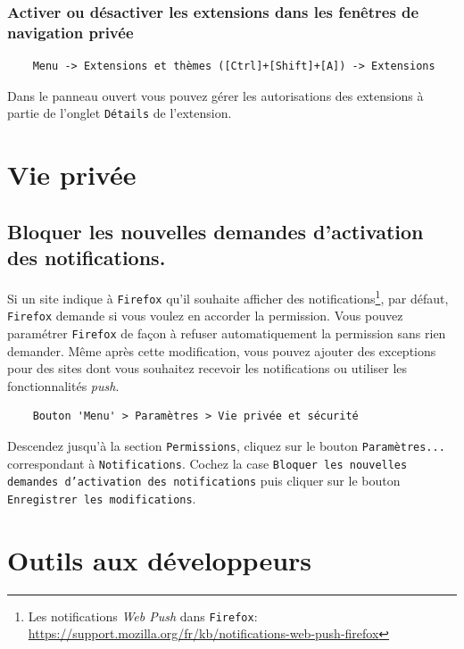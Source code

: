 \documentclass[a4paper,11pt]{book}
\begin{document}
\subsection*{Activer ou désactiver les extensions dans les fenêtres de navigation privée}
\begin{verbatim}
    Menu -> Extensions et thèmes ([Ctrl]+[Shift]+[A]) -> Extensions
\end{verbatim}
\medskip

Dans le panneau ouvert vous pouvez gérer les autorisations des extensions à partie de l'onglet \texttt{Détails} de l'extension.
\medskip

\chapter{Vie privée}
\section{Bloquer les nouvelles demandes d’activation des notifications.}
Si un site indique à \texttt{Firefox} qu’il souhaite afficher des notifications\footnote{Les notifications \textit{Web Push} dans \texttt{Firefox}: \url{https://support.mozilla.org/fr/kb/notifications-web-push-firefox}}, par défaut, \texttt{Firefox} demande si vous voulez en accorder la permission. Vous pouvez paramétrer \texttt{Firefox} de façon à refuser automatiquement la permission sans rien demander. Même après cette modification, vous pouvez ajouter des exceptions pour des sites dont vous souhaitez recevoir les notifications ou utiliser les fonctionnalités \textit{push}.
\begin{verbatim}
    Bouton 'Menu' > Paramètres > Vie privée et sécurité 
\end{verbatim} 
\medskip

Descendez jusqu’à la section \texttt{Permissions}, cliquez sur le bouton \texttt{Paramètres...} correspondant à \texttt{Notifications}. Cochez la case \texttt{Bloquer les nouvelles demandes d’activation des notifications} puis cliquer sur le bouton \texttt{Enregistrer les modifications}.
\medskip

\chapter{Outils aux développeurs}
\end{document}
